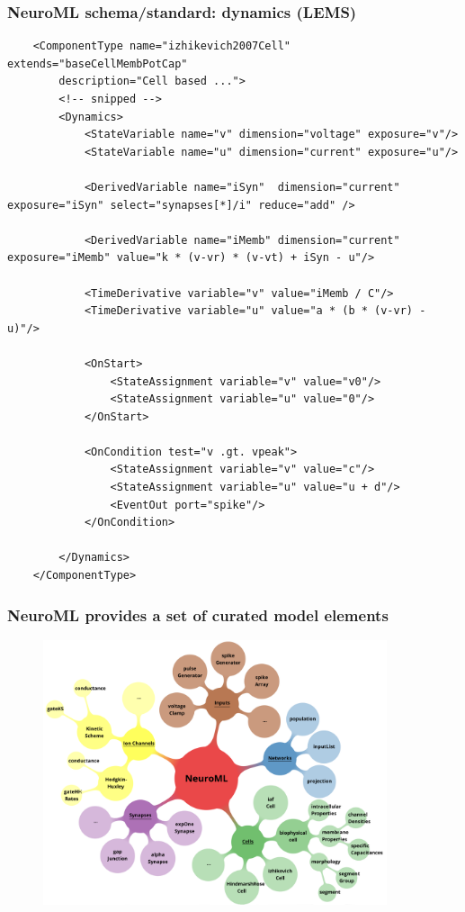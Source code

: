\begin{frame}[fragile,c]
  \frametitle{NeuroML schema/standard: dynamics (LEMS)}
  \begin{center}
    \begin{verbatim}
    <ComponentType name="izhikevich2007Cell" extends="baseCellMembPotCap"
        description="Cell based ...">
        <!-- snipped -->
        <Dynamics>
            <StateVariable name="v" dimension="voltage" exposure="v"/>
            <StateVariable name="u" dimension="current" exposure="u"/>

            <DerivedVariable name="iSyn"  dimension="current" exposure="iSyn" select="synapses[*]/i" reduce="add" />

            <DerivedVariable name="iMemb" dimension="current" exposure="iMemb" value="k * (v-vr) * (v-vt) + iSyn - u"/>

            <TimeDerivative variable="v" value="iMemb / C"/>
            <TimeDerivative variable="u" value="a * (b * (v-vr) - u)"/>

            <OnStart>
                <StateAssignment variable="v" value="v0"/>
                <StateAssignment variable="u" value="0"/>
            </OnStart>

            <OnCondition test="v .gt. vpeak">
                <StateAssignment variable="v" value="c"/>
                <StateAssignment variable="u" value="u + d"/>
                <EventOut port="spike"/>
            </OnCondition>

        </Dynamics>
    </ComponentType>
    \end{verbatim}
  \end{center}
\end{frame}
\begin{frame}[c]
  \frametitle{NeuroML provides a set of curated model elements}
  \begin{figure}[h]
    \centering
    \includegraphics[width=0.9\textwidth]{99_images/neuroml-mindmap}
  \end{figure}%
\end{frame}
